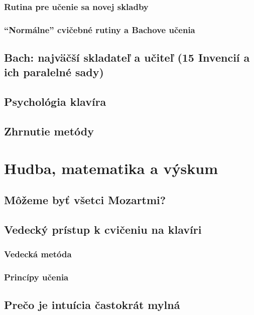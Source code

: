 \subsubsection{Rutina pre učenie sa novej skladby}

\subsubsection{“Normálne” cvičebné rutiny a Bachove učenia}

\subsection{Bach: najväčší skladateľ a učiteľ (15 Invencií a ich paralelné sady)}

\subsection{Psychológia klavíra}

\subsection{Zhrnutie metódy}

\section{Hudba, matematika a výskum}

\subsection{Môžeme byť všetci Mozartmi?}

\subsection{Vedecký prístup k cvičeniu na klavíri}

\subsubsection{Vedecká metóda}

\subsubsection{Princípy učenia}

\subsection{Prečo je intuícia častokrát mylná}

